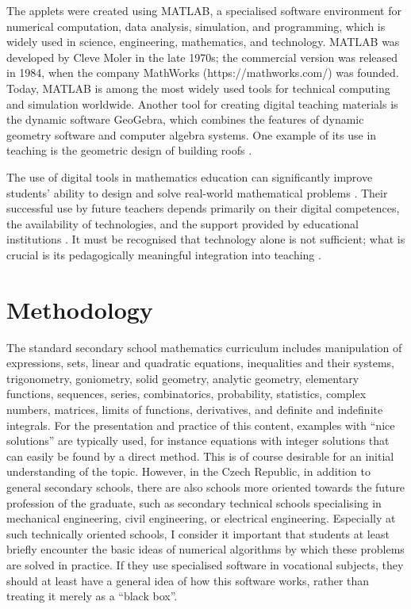 \documentclass[a4paper,12pt]{article}
\begin{document}
The applets were created using MATLAB, a specialised software environment for numerical computation, data analysis, simulation, and programming, which is widely used in science, engineering, mathematics, and technology. MATLAB was developed by Cleve Moler in the late 1970s; the commercial version was released in 1984, when the company MathWorks (https://mathworks.com/) was founded. Today, MATLAB is among the most widely used tools for technical computing and simulation worldwide. Another tool for creating digital teaching materials is the dynamic software GeoGebra, which combines the features of dynamic geometry software and computer algebra systems. One example of its use in teaching is the geometric design of building roofs \cite{Tomiczkova2025}. 

The use of digital tools in mathematics education can significantly improve students' ability to design and solve real-world mathematical problems \cite{Greefrath2018}. 
Their successful use by future teachers depends primarily on their digital competences, the availability 
of technologies, and the support provided by educational institutions 
\cite{Ishartono2025,Godfrey2008,Yu2026}. 
It must be recognised that technology alone is not sufficient; what is crucial is its pedagogically meaningful integration into teaching \cite{Greefrath2011,Weintrop2016}.  

\section{Methodology}\label{sec:methodology}
The standard secondary school mathematics curriculum includes manipulation of expressions, sets, linear and quadratic equations, inequalities and their systems, trigonometry, goniometry, solid geometry, analytic geometry, elementary functions, sequences, series, combinatorics, probability, statistics, complex numbers, matrices, limits of functions, derivatives, and definite and indefinite integrals. For the presentation and practice of this content, examples with ``nice solutions'' are typically used, for instance equations with integer solutions that can easily be found by a direct method. This is of course desirable for an initial understanding of the topic. However, in the Czech Republic, in addition to general secondary schools, there are also schools more oriented towards the future profession of the graduate, such as secondary technical schools specialising in mechanical engineering, civil engineering, or electrical engineering. Especially at such technically oriented schools, I consider it important that students at least briefly encounter the basic ideas of numerical algorithms by which these problems are solved in practice. If they use specialised software in vocational subjects, they should at least have a general idea of how this software works, rather than treating it merely as a ``black box''.
\end{document}
